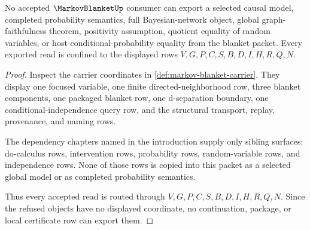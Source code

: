 \begin{theorem}
\label{thm:markov-blanket-nonescape}
No accepted $\MarkovBlanketUp$ consumer can export a selected causal model, completed probability semantics, full Bayesian-network object, global graph-faithfulness theorem, positivity assumption, quotient equality of random variables, or host conditional-probability equality from the blanket packet. Every exported read is confined to the displayed rows $V,G,P,C,S,B,D,I,H,R,Q,N$.
\end{theorem}
\begin{proof}
Inspect the carrier coordinates in \autoref{def:markov-blanket-carrier}. They display one focused variable, one finite directed-neighborhood row, three blanket components, one packaged blanket row, one d-separation boundary, one conditional-independence query row, and the structural transport, replay, provenance, and naming rows.

The dependency chapters named in the introduction supply only sibling surfaces: do-calculus rows, intervention rows, probability rows, random-variable rows, and independence rows. None of those rows is copied into this packet as a selected global model or as completed probability semantics.

Thus every accepted read is routed through $V,G,P,C,S,B,D,I,H,R,Q,N$. Since the refused objects have no displayed coordinate, no continuation, package, or local certificate row can export them.
\end{proof}




